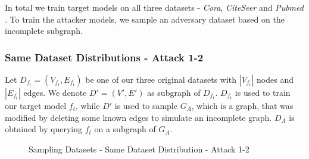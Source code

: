       In total we train target models on all three datasets - \emph{Cora}, \emph{CiteSeer} and \emph{Pubmed} .
      To train the attacker models, we sample an adversary dataset based on the incomplete subgraph.

      \subsubsection*{Same Dataset Distributions - Attack 1-2}
        Let $D_{f_t} = (V_{f_t}, E_{f_t})$ be one of our three original datasets with $|V_{f_t}|$ nodes and $|E_{f_t}|$ edges.
        We denote $D' = (V',E')$ as subgraph of $D_{f_t}$.
        $D_{f_t}$ is used to train our target model $f_t$, while $D'$ is used to sample $G_{A}$, which is a graph, that was modified by deleting some known edges to simulate an incomplete graph.
        $D_A$ is obtained by querying $f_t$ on a subgraph of $G_A$. 

        \vspace{0.48cm}
        \begin{figure}[h!]
          \begin{center}
          \end{center}
          \caption{Sampling Datasets - Same Dataset Distribution - Attack 1-2}
          \label{figure:sample-datasets-attack1-2}
        \end{figure}

